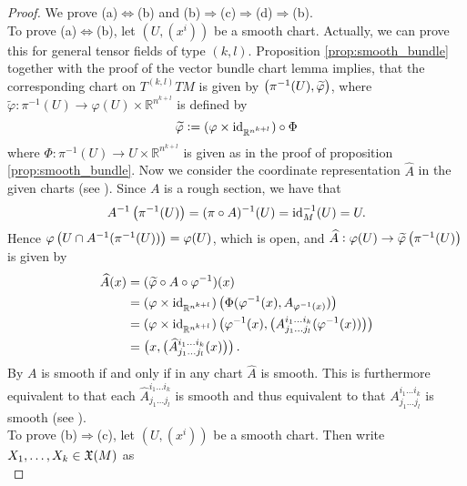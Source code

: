 \begin{appendix}
\begin{proof}
We prove (a)$\Leftrightarrow$(b) and (b)$\Rightarrow$(c)$\Rightarrow$(d)$\Rightarrow$(b).\\
To prove (a)$\Leftrightarrow$(b), let $(U,(x^i))$ be a smooth chart. Actually, we can prove this for general tensor fields of type $(k,l)$. Proposition \ref{prop:smooth_bundle} together with the proof of the vector bundle chart lemma \cite[253--254]{lee:smooth_manifolds:2013} implies, that the corresponding chart on $T^{(k,l)}TM$ is given by $\del[1]{\pi^{-1}(U),\widetilde{\varphi}}$, where $\widetilde{\varphi}: \pi^{-1}(U) \to \varphi(U) \times \mathbb{R}^{n^{k+l}}$ is defined by
\begin{equation*}
\widetilde{\varphi} := (\varphi \times \operatorname{id}_{\mathbb{R}^{n^{k+l}}}) \circ \Phi
\end{equation*}
\noindent where $\Phi : \pi^{-1}(U) \to U \times \mathbb{R}^{n^{k + l}}$ is given as in the proof of proposition \ref{prop:smooth_bundle}. Now we consider the coordinate representation $\widehat{A}$ in the given charts (see \cite[35]{lee:smooth_manifolds:2013}). Since $A$ is a rough section, we have that 
\begin{equation*}
A^{-1}\del[1]{\pi^{-1}(U)} = (\pi \circ A)^{-1}(U) = \id_M^{-1}(U) = U.
\end{equation*}
Hence $\varphi\del[1]{U \cap A^{-1}(\pi^{-1}(U))} = \varphi(U)$, which is open, and $\widehat{A}: \varphi(U) \to \widetilde{\varphi}\del[1]{\pi^{-1}(U)}$ is given by
\begin{align*}
\widehat{A}(x) &= (\widetilde{\varphi} \circ A \circ \varphi^{-1})(x)\\
&= (\varphi \times \id_{\mathbb{R}^{n^{k+l}}})\del[1]{\Phi(\varphi^{-1}(x),A_{\varphi^{-1}(x)})}\\
&= (\varphi \times \id_{\mathbb{R}^{n^{k+l}}})\del[1]{\varphi^{-1}(x),\del[1]{A^{i_1\dots i_k}_{j_1\dots j_l}(\varphi^{-1}(x))}}\\
&= \del[1]{x,\del[1]{\widehat{A}^{i_1\dots i_k}_{j_1\dots j_l}(x)}}.
\end{align*}
By \cite[35]{lee:smooth_manifolds:2013} $A$ is smooth if and only if in any chart $\widehat{A}$ is smooth. This is furthermore equivalent to that each $\widehat{A}^{i_1\dots i_k}_{j_1\dots j_l}$ is smooth and thus equivalent to that $A^{i_1\dots i_k}_{j_1\dots j_l}$ is smooth (see \cite[33]{lee:smooth_manifolds:2013}).\\
To prove (b)$\Rightarrow$(c), let $(U,(x^i))$ be a smooth chart. Then write $X_1,\dots,X_k \in \mathfrak{X}(M)$ as 
\begin{equation*}

\end{equation*}
\end{proof}
\end{appendix}
